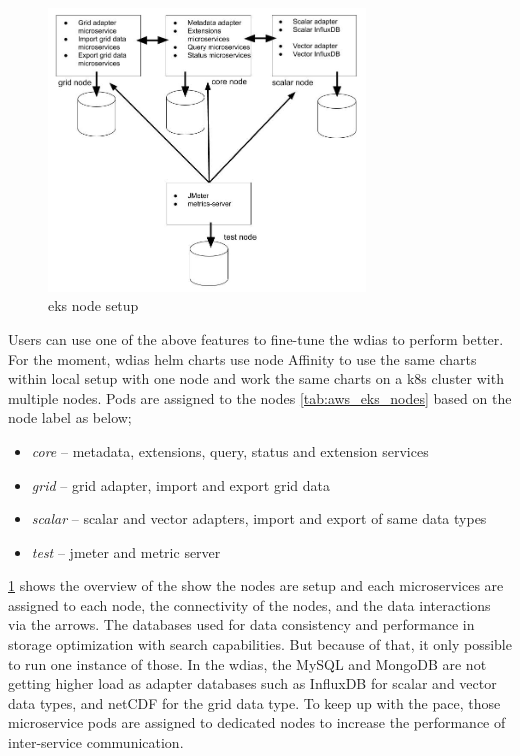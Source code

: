 \begin{figure}[htp]
    \centering
    \includegraphics[width=0.75\textwidth]{results/work_load/eks_node_setup.jpg}
    \caption{\acrfull{eks} node setup}
    \label{fi:eks_node_setup}
\end{figure}

Users can use one of the above features to fine-tune the \acrshort{wdias} to perform better. For the moment, \acrshort{wdias} helm charts use node Affinity to use the same charts within local setup with one node and work the same charts on a \acrshort{k8s} cluster with multiple nodes. Pods are assigned to the nodes \cref{tab:aws_eks_nodes} based on the node label as below;
\begin{itemize}
    \item \emph{core} -- metadata, extensions, query, status and extension services
    \item \emph{grid} -- grid adapter, import and export grid data
    \item \emph{scalar} -- scalar and vector adapters, import and export of same data types
    \item \emph{test} -- \acrshort{jmeter} and metric server
\end{itemize}
\cref{fi:eks_node_setup} shows the overview of the show the nodes are setup and each microservices are assigned to each node, the connectivity of the nodes, and the data interactions via the arrows.
The databases used for data consistency and performance in storage optimization with search capabilities. But because of that, it only possible to run one instance of those. In the \acrshort{wdias}, the MySQL and MongoDB are not getting higher load as adapter databases such as InfluxDB for scalar and vector data types, and netCDF for the grid data type. To keep up with the pace, those microservice pods are assigned to dedicated nodes to increase the performance of inter-service communication.
